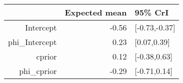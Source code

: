 \begin{tabular}{rrl}
  \hline
 & Expected mean & 95\% CrI \\ 
  \hline
Intercept & -0.56 & [-0.73,-0.37] \\ 
  phi\_Intercept & 0.23 & [0.07,0.39] \\ 
  cprior & 0.12 & [-0.38,0.63] \\ 
  phi\_cprior & -0.29 & [-0.71,0.14] \\ 
   \hline
\end{tabular}

